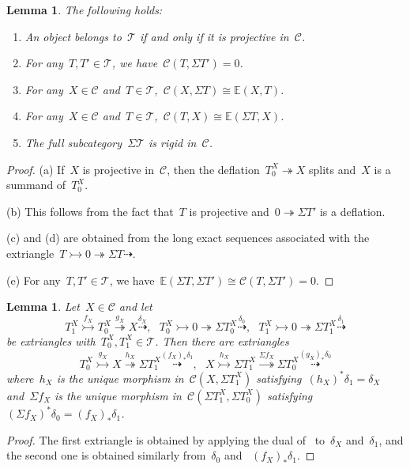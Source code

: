 \documentclass{amsart}
\newtheorem{lemma}[theorem]{Lemma}
\theoremstyle{definition}
\newcommand{\cat}{\mathcal{C}}
\newcommand{\susp}{\Sigma}
\newcommand{\tc}{\mathcal{T}}
\newcommand{\infl}{\rightarrowtail}
\newcommand{\defl}{\twoheadrightarrow}
\begin{document}
\begin{lemma}
\label{lemma::first consequences}
The following holds:
\begin{enumerate}[{\rm (a)}]
 \item An object belongs to~$\tc$ if and only if it is projective in~$\cat$.
 \item For any~$T,T'\in\tc$, we have~$\cat(T,\susp T')=0$.
 \item For any~$X\in\cat$ and~$T\in\tc$,~$\cat(X,\susp T)\cong\mathbb{E}(X,T)$.
 \item For any~$X\in\cat$ and~$T\in\tc$,~$\cat(T,X)\cong\mathbb{E}(\susp T,X)$.
 \item The full subcategory~$\susp\tc$ is rigid in~$\cat$.
\end{enumerate}
\end{lemma}

\begin{proof}
(a) If~$X$ is projective in~$\cat$, then the deflation~$T_0^X\defl X$ splits and~$X$ is a summand of~$T_0^X$.

(b) This follows from the fact that~$T$ is projective and~$0\defl\susp T'$ is a deflation.

(c) and (d) are obtained from the long exact sequences associated with the extriangle~$T\infl 0\defl \susp T\dashrightarrow$.

(e) For any~$T,T'\in\tc$, we have~$\mathbb{E}(\susp T,\susp T') \cong \cat(T,\susp T')=0$.
\end{proof}

\begin{lemma}
\label{lemma::shifts of extriangles}
Let~$X\in\cat$ and let
\[
T_1^X\overset{f_X}{\infl} T_0^X\overset{g_X}{\defl} X \overset{\delta_X}{\dashrightarrow}, \ \ \ T_0^X\infl 0\defl \susp T_0^X\overset{\delta_0}{\dashrightarrow}, \ \ \ T_1^X\infl 0\defl \susp T_1^X\overset{\delta_1}{\dashrightarrow}
\]
be extriangles with~$T_0^X,T_1^X\in\tc$.
Then there are extriangles
\[
T_0^X\overset{g_X}{\infl} X \overset{h_X}{\defl} \susp T_1^X \overset{(f_X)_\ast\delta_1}{\dashrightarrow}, \ \ \ X \overset{h_X}{\infl} \susp T_1^X \overset{\susp f_X}{\defl} \susp T_0^X \overset{(g_X)_\ast\delta_0}{\dashrightarrow}
\]
where~$h_X$ is the unique morphism in~$\cat(X,\susp T_1^X)$ satisfying~$(h_X)^\ast\delta_1=\delta_X$ and~$\susp f_X$ is the unique morphism in~$\cat(\susp T_1^X,\susp T_0^X)$ satisfying~$(\susp f_X)^\ast\delta_0 = (f_X)_\ast\delta_1$.
\end{lemma}

\begin{proof}
The first extriangle is obtained by applying the dual of~\cite[Proposition 3.15]{NakaokaPalu} to~$\delta_X$ and~$\delta_1$, and the second one is obtained similarly from~$\delta_0$ and ~$(f_X)_\ast \delta_1$.
\end{proof}
\end{document}
